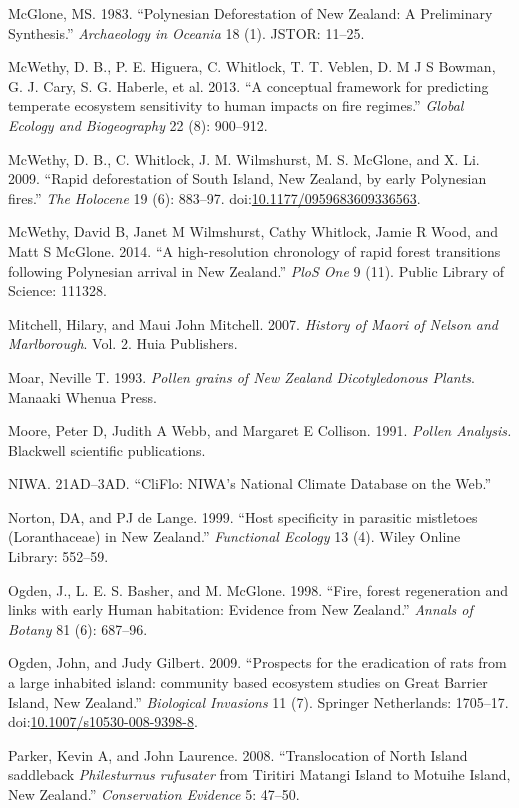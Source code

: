 \documentclass[]{article}
\begin{document}
McGlone, MS. 1983. ``Polynesian Deforestation of New Zealand: A Preliminary Synthesis.'' \emph{Archaeology in Oceania} 18 (1). JSTOR: 11--25.

McWethy, D. B., P. E. Higuera, C. Whitlock, T. T. Veblen, D. M J S Bowman, G. J. Cary, S. G. Haberle, et al. 2013. ``A conceptual framework for predicting temperate ecosystem sensitivity to human impacts on fire regimes.'' \emph{Global Ecology and Biogeography} 22 (8): 900--912.

McWethy, D. B., C. Whitlock, J. M. Wilmshurst, M. S. McGlone, and X. Li. 2009. ``Rapid deforestation of South Island, New Zealand, by early Polynesian fires.'' \emph{The Holocene} 19 (6): 883--97. doi:\href{https://doi.org/10.1177/0959683609336563}{10.1177/0959683609336563}.

McWethy, David B, Janet M Wilmshurst, Cathy Whitlock, Jamie R Wood, and Matt S McGlone. 2014. ``A high-resolution chronology of rapid forest transitions following Polynesian arrival in New Zealand.'' \emph{PloS One} 9 (11). Public Library of Science: 111328.

Mitchell, Hilary, and Maui John Mitchell. 2007. \emph{History of Maori of Nelson and Marlborough}. Vol. 2. Huia Publishers.

Moar, Neville T. 1993. \emph{Pollen grains of New Zealand Dicotyledonous Plants}. Manaaki Whenua Press.

Moore, Peter D, Judith A Webb, and Margaret E Collison. 1991. \emph{Pollen Analysis.} Blackwell scientific publications.

NIWA. 21AD--3AD. ``CliFlo: NIWA's National Climate Database on the Web.''

Norton, DA, and PJ de Lange. 1999. ``Host specificity in parasitic mistletoes (Loranthaceae) in New Zealand.'' \emph{Functional Ecology} 13 (4). Wiley Online Library: 552--59.

Ogden, J., L. E. S. Basher, and M. McGlone. 1998. ``Fire, forest regeneration and links with early Human habitation: Evidence from New Zealand.'' \emph{Annals of Botany} 81 (6): 687--96.

Ogden, John, and Judy Gilbert. 2009. ``Prospects for the eradication of rats from a large inhabited island: community based ecosystem studies on Great Barrier Island, New Zealand.'' \emph{Biological Invasions} 11 (7). Springer Netherlands: 1705--17. doi:\href{https://doi.org/10.1007/s10530-008-9398-8}{10.1007/s10530-008-9398-8}.

Parker, Kevin A, and John Laurence. 2008. ``Translocation of North Island saddleback \emph{Philesturnus rufusater} from Tiritiri Matangi Island to Motuihe Island, New Zealand.'' \emph{Conservation Evidence} 5: 47--50.
\end{document}
